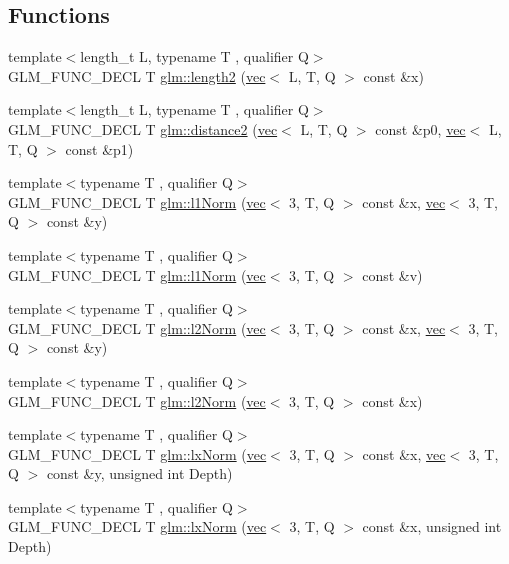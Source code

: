 \subsection*{Functions}
\begin{DoxyCompactItemize}
\item 
{\footnotesize template$<$length\+\_\+t L, typename T , qualifier Q$>$ }\\G\+L\+M\+\_\+\+F\+U\+N\+C\+\_\+\+D\+E\+CL T \hyperlink{group__gtx__norm_ga8d1789651050adb7024917984b41c3de}{glm\+::length2} (\hyperlink{structglm_1_1vec}{vec}$<$ L, T, Q $>$ const \&x)
\item 
{\footnotesize template$<$length\+\_\+t L, typename T , qualifier Q$>$ }\\G\+L\+M\+\_\+\+F\+U\+N\+C\+\_\+\+D\+E\+CL T \hyperlink{group__gtx__norm_ga85660f1b79f66c09c7b5a6f80e68c89f}{glm\+::distance2} (\hyperlink{structglm_1_1vec}{vec}$<$ L, T, Q $>$ const \&p0, \hyperlink{structglm_1_1vec}{vec}$<$ L, T, Q $>$ const \&p1)
\item 
{\footnotesize template$<$typename T , qualifier Q$>$ }\\G\+L\+M\+\_\+\+F\+U\+N\+C\+\_\+\+D\+E\+CL T \hyperlink{group__gtx__norm_gae2fc0b2aa967bebfd6a244700bff6997}{glm\+::l1\+Norm} (\hyperlink{structglm_1_1vec}{vec}$<$ 3, T, Q $>$ const \&x, \hyperlink{structglm_1_1vec}{vec}$<$ 3, T, Q $>$ const \&y)
\item 
{\footnotesize template$<$typename T , qualifier Q$>$ }\\G\+L\+M\+\_\+\+F\+U\+N\+C\+\_\+\+D\+E\+CL T \hyperlink{group__gtx__norm_ga1a7491e2037ceeb37f83ce41addfc0be}{glm\+::l1\+Norm} (\hyperlink{structglm_1_1vec}{vec}$<$ 3, T, Q $>$ const \&v)
\item 
{\footnotesize template$<$typename T , qualifier Q$>$ }\\G\+L\+M\+\_\+\+F\+U\+N\+C\+\_\+\+D\+E\+CL T \hyperlink{group__gtx__norm_ga41340b2ef40a9307ab0f137181565168}{glm\+::l2\+Norm} (\hyperlink{structglm_1_1vec}{vec}$<$ 3, T, Q $>$ const \&x, \hyperlink{structglm_1_1vec}{vec}$<$ 3, T, Q $>$ const \&y)
\item 
{\footnotesize template$<$typename T , qualifier Q$>$ }\\G\+L\+M\+\_\+\+F\+U\+N\+C\+\_\+\+D\+E\+CL T \hyperlink{group__gtx__norm_gae288bde8f0e41fb4ed62e65137b18cba}{glm\+::l2\+Norm} (\hyperlink{structglm_1_1vec}{vec}$<$ 3, T, Q $>$ const \&x)
\item 
{\footnotesize template$<$typename T , qualifier Q$>$ }\\G\+L\+M\+\_\+\+F\+U\+N\+C\+\_\+\+D\+E\+CL T \hyperlink{group__gtx__norm_gacad23d30497eb16f67709f2375d1f66a}{glm\+::lx\+Norm} (\hyperlink{structglm_1_1vec}{vec}$<$ 3, T, Q $>$ const \&x, \hyperlink{structglm_1_1vec}{vec}$<$ 3, T, Q $>$ const \&y, unsigned int Depth)
\item 
{\footnotesize template$<$typename T , qualifier Q$>$ }\\G\+L\+M\+\_\+\+F\+U\+N\+C\+\_\+\+D\+E\+CL T \hyperlink{group__gtx__norm_gac61b6d81d796d6eb4d4183396a19ab91}{glm\+::lx\+Norm} (\hyperlink{structglm_1_1vec}{vec}$<$ 3, T, Q $>$ const \&x, unsigned int Depth)
\end{DoxyCompactItemize}


